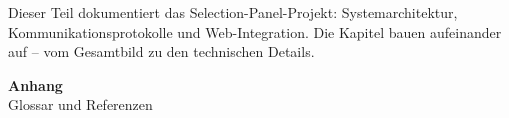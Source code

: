 \documentclass{techdoc}
\begin{document}
\begin{infobox}[Projektüberblick]
Dieser Teil dokumentiert das Selection-Panel-Projekt: Systemarchitektur,
Kommunikationsprotokolle und Web-Integration. Die Kapitel bauen aufeinander auf
-- vom Gesamtbild zu den technischen Details.
\end{infobox}

\clearpage


\clearpage


\clearpage


\clearpage

\appendix

{%
  \clearpage
  \vspace*{2cm}
  \begin{center}
    {\sffamily\bfseries\Huge Anhang}\\[1em]
    {\large\color{MutedText} Glossar und Referenzen}
  \end{center}
  \vspace{1cm}
}

\clearpage


\end{document}
